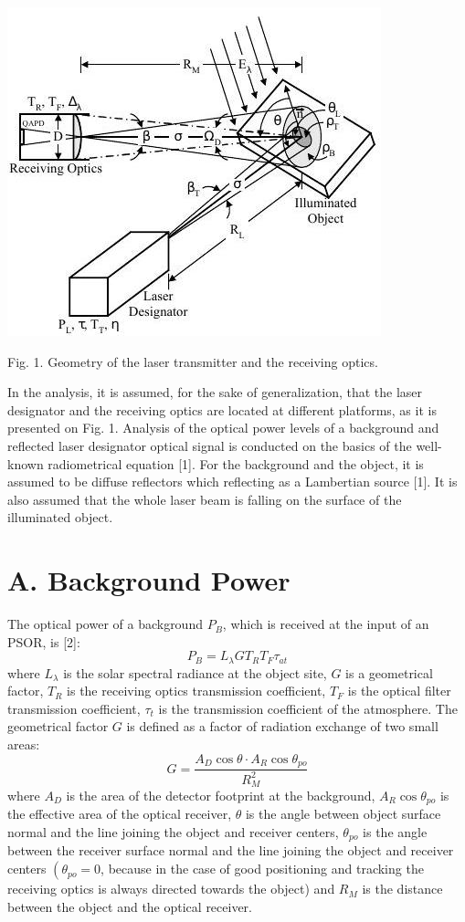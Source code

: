 \documentclass[10pt]{article}
\begin{document}
\includegraphics[max width=\textwidth]{d2750892714501b765cfde22b041f38a-02}

Fig. 1. Geometry of the laser transmitter and the receiving optics.

In the analysis, it is assumed, for the sake of generalization, that the laser designator and the receiving optics are located at different platforms, as it is presented on Fig. 1. Analysis of the optical power levels of a background and reflected laser designator optical signal is conducted on the basics of the well-known radiometrical equation [1]. For the background and the object, it is assumed to be diffuse reflectors which reflecting as a Lambertian source [1]. It is also assumed that the whole laser beam is falling on the surface of the illuminated object.

\section{A. Background Power}
The optical power of a background \(P_{B}\), which is received at the input of an PSOR, is [2]:
\[
P_{B}=L_{\lambda} G T_{R} T_{F} \tau_{a t}
\]
where \(L_{\lambda}\) is the solar spectral radiance at the object site, \(G\) is a geometrical factor, \(T_{R}\) is the receiving optics transmission coefficient, \(T_{F}\) is the optical filter transmission coefficient, \(\tau_{t}\) is the transmission coefficient of the atmosphere. The geometrical factor \(G\) is defined as a factor of radiation exchange of two small areas:
\[
G=\frac{A_{D} \cos \theta \cdot A_{R} \cos \theta_{p o}}{R_{M}^{2}}
\]
where \(A_{D}\) is the area of the detector footprint at the background, \(A_{R} \cos \theta_{p o}\) is the effective area of the optical receiver, \(\theta\) is the angle between object surface normal and the line joining the object and receiver centers, \(\theta_{p o}\) is the angle between the receiver surface normal and the line joining the object and receiver centers \(\left(\theta_{p o}=0\right.\), because in the case of good positioning and tracking the receiving optics is always directed towards the object) and \(R_{M}\) is the distance between the object and the optical receiver.
\end{document}
